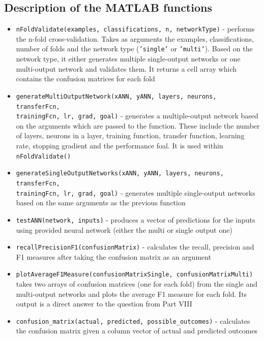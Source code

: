 \documentclass[a4paper]{article}
\begin{document}
\subsection{Description of the MATLAB functions}
\begin{itemize}
\item \texttt{nFoldValidate(examples, classifications, n, networkType)} - performs the n-fold cross-validation. Takes as arguments the examples, classifications, number of folds and the network type (\texttt{'single'} or \texttt{'multi'}). Based on the network type, it either generates multiple single-output networks or one multi-output network and validates them. It returns a cell array which contains the confusion matrices for each fold
\item \texttt{generateMultiOutputNetwork(xANN, yANN, layers, neurons, transferFcn,\\trainingFcn, lr, grad, goal)} - generates a multiple-output network based on the arguments which are passed to the function. These include the number of layers, neurons in a layer, training function, transfer function, learning rate, stopping gradient and the performance foal. It is used within \texttt{nFoldValidate()}
\item \texttt{generateSingleOutputNetworks(xANN, yANN, layers, neurons, transferFcn,\\trainingFcn, lr, grad, goal)} - generates multiple single-output networks based on the same arguments as the previous function
\item \texttt{testANN(network, inputs)} - produces a vector of predictions for the  inputs using provided neural network (either the multi or single output one)
\item \texttt{recallPrecisionF1(confusionMatrix)} - calculates the recall, precision and F1 measures after taking the confusion matrix as an argument
\item \texttt{plotAverageF1Measure(confusionMatrixSingle, confusionMatrixMulti)} takes two arrays of confusion matrices (one for each fold) from the single and multi-output networks and plots the average F1 measure for each fold. Its output is a direct answer to the question from Part VIII
\item \texttt{confusion\_matrix(actual, predicted, possible\_outcomes)} - calculates the confusion matrix given a column vector of actual and predicted outcomes
\end{itemize}

\clearpage

\end{document}
